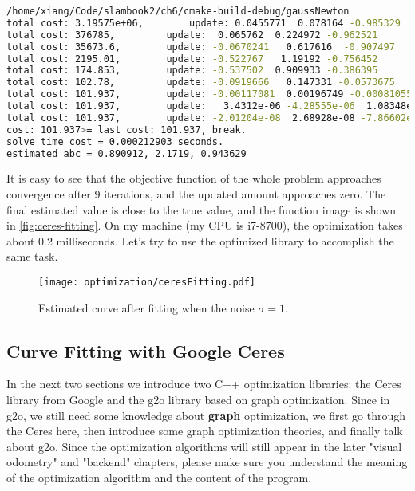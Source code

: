 \begin{lstlisting}[language=sh,caption=terminal output:]
/home/xiang/Code/slambook2/ch6/cmake-build-debug/gaussNewton
total cost: 3.19575e+06, 		update: 0.0455771  0.078164 -0.985329		estimated params: 2.04558,-0.921836,4.01467
total cost: 376785, 		update:  0.065762  0.224972 -0.962521		estimated params: 2.11134,-0.696864,3.05215
total cost: 35673.6, 		update: -0.0670241   0.617616  -0.907497		estimated params: 2.04432,-0.0792484,2.14465
total cost: 2195.01, 		update: -0.522767   1.19192 -0.756452		estimated params: 1.52155,1.11267,1.3882
total cost: 174.853, 		update: -0.537502  0.909933 -0.386395		estimated params: 0.984045,2.0226,1.00181
total cost: 102.78, 		update: -0.0919666   0.147331 -0.0573675		estimated params: 0.892079,2.16994,0.944438
total cost: 101.937, 		update: -0.00117081  0.00196749 -0.00081055		estimated params: 0.890908,2.1719,0.943628
total cost: 101.937, 		update:   3.4312e-06 -4.28555e-06  1.08348e-06		estimated params: 0.890912,2.1719,0.943629
total cost: 101.937, 		update: -2.01204e-08  2.68928e-08 -7.86602e-09		estimated params: 0.890912,2.1719,0.943629
cost: 101.937>= last cost: 101.937, break.
solve time cost = 0.000212903 seconds.
estimated abc = 0.890912, 2.1719, 0.943629
\end{lstlisting}
It is easy to see that the objective function of the whole problem approaches convergence after 9 iterations, and the updated amount approaches zero. The final estimated value is close to the true value, and the function image is shown in \autoref{fig:ceres-fitting}. On my machine (my CPU is i7-8700), the optimization takes about 0.2 milliseconds. Let's try to use the optimized library to accomplish the same task.

\begin{figure}[!ht]
    \centering
    \texttt{[image: optimization/ceresFitting.pdf]}
    \caption{Estimated curve after fitting when the noise $\sigma=1$. }
    \label{fig:ceres-fitting}
\end{figure}

\subsection{Curve Fitting with Google Ceres}
In the next two sections we introduce two C++ optimization libraries: the Ceres library \textsuperscript{\cite{Ceres}} from Google and the g2o library \textsuperscript{\cite{Kummerle2011}} based on graph optimization. Since in g2o, we still need some knowledge about \textbf{graph} optimization, we first go through the Ceres here, then introduce some graph optimization theories, and finally talk about g2o. Since the optimization algorithms will still appear in the later "visual odometry" and "backend" chapters, please make sure you understand the meaning of the optimization algorithm and the content of the program.

